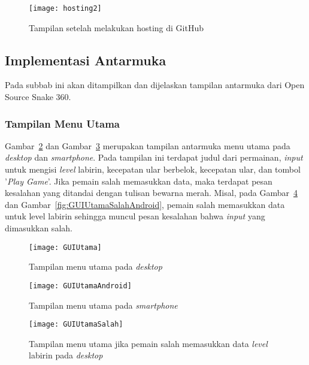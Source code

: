 \begin{figure}[H]
	\centering  
	\texttt{[image: hosting2]}  
	\caption[Tampilan setelah melakukan hosting di GitHub]{Tampilan setelah melakukan hosting di GitHub}
	\label{fig:hosting2} 
\end{figure}

\subsection{Implementasi Antarmuka}
Pada subbab ini akan ditampilkan dan dijelaskan tampilan antarmuka dari Open Source Snake 360. 

\subsubsection{Tampilan Menu Utama}
Gambar~\ref{fig:GUIUtama} dan Gambar~\ref{fig:GUIUtamaAndroid} merupakan tampilan antarmuka menu utama pada \textit{desktop} dan \textit{smartphone}. Pada tampilan ini terdapat judul dari permainan, \textit{input} untuk mengisi \textit{level} labirin, kecepatan ular berbelok, kecepatan ular, dan tombol '\textit{Play Game}'. Jika pemain salah memasukkan data, maka terdapat pesan kesalahan yang ditandai dengan tulisan bewarna merah. Misal, pada Gambar~\ref{fig:GUIUtamaSalah} dan Gambar~\ref{fig:GUIUtamaSalahAndroid}, pemain salah memasukkan data untuk level labirin sehingga muncul pesan kesalahan bahwa \textit{input} yang dimasukkan salah.

\begin{figure}[H]
	\centering  
	\texttt{[image: GUIUtama]}  
	\caption[Tampilan menu utama pada \textit{desktop}]{Tampilan menu utama pada \textit{desktop}}
	\label{fig:GUIUtama} 
\end{figure}

\begin{figure}[H]
	\centering  
	\texttt{[image: GUIUtamaAndroid]}  
	\caption[Tampilan menu utama pada \textit{smartphone}]{Tampilan menu utama pada \textit{smartphone}}
	\label{fig:GUIUtamaAndroid} 
\end{figure}

\begin{figure}[H]
	\centering  
	\texttt{[image: GUIUtamaSalah]}  
	\caption[Tampilan menu utama jika pemain salah memasukkan data \textit{level} labirin pada \textit{desktop}]{Tampilan menu utama jika pemain salah memasukkan data \textit{level} labirin pada \textit{desktop}}
	\label{fig:GUIUtamaSalah} 
\end{figure}

